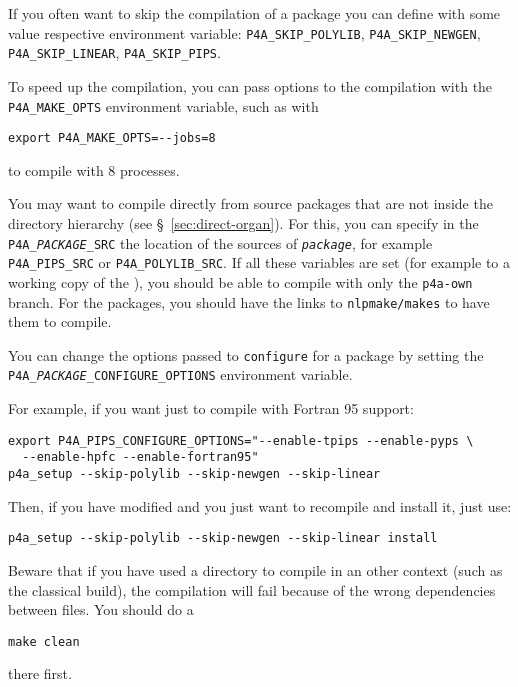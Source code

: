 \documentclass[a4paper]{article}
\begin{document}
If you often want to skip the compilation of a package you can define with
some value respective environment variable: \verb|P4A_SKIP_POLYLIB|,
\verb|P4A_SKIP_NEWGEN|, \verb|P4A_SKIP_LINEAR|, \verb|P4A_SKIP_PIPS|.

To speed up the compilation, you can pass options to the compilation with
the \verb|P4A_MAKE_OPTS| environment variable, such as with
\begin{verbatim}
export P4A_MAKE_OPTS=--jobs=8
\end{verbatim}
to compile with 8 processes.

You may want to compile \Apfa directly from source packages that are not
inside the \Apfa directory hierarchy (see \S~\ref{sec:direct-organ}). For
this, you can specify in the \texttt{P4A\_\emph{PACKAGE}\_SRC} the
location of the sources of \texttt{\emph{package}}, for example
\verb|P4A_PIPS_SRC| or \verb|P4A_POLYLIB_SRC|. If all these variables are
set (for example to a working copy of the \Apips{} \Asvn), you should be
able to compile with only the \texttt{p4a-own} branch. For the \Apips
packages, you should have the links to \texttt{nlpmake/makes} to have them
to compile.

You can change the options passed to \texttt{configure} for a package by
setting the \texttt{P4A\_\emph{PACKAGE}\_CONFIGURE\_OPTIONS} environment
variable.

For example, if you want just to compile \Apips with Fortran 95 support:
\begin{verbatim}
export P4A_PIPS_CONFIGURE_OPTIONS="--enable-tpips --enable-pyps \
  --enable-hpfc --enable-fortran95"
p4a_setup --skip-polylib --skip-newgen --skip-linear
\end{verbatim}

Then, if you have modified \Apips and you just want to recompile and
install it, just use:
\begin{verbatim}
p4a_setup --skip-polylib --skip-newgen --skip-linear install
\end{verbatim}

Beware that if you have used a \Apips directory to compile in an other
context (such as the classical \Asvn build), the compilation will fail
because of the wrong dependencies between files. You should do a
\begin{verbatim}
make clean
\end{verbatim}
there first.
\end{document}
